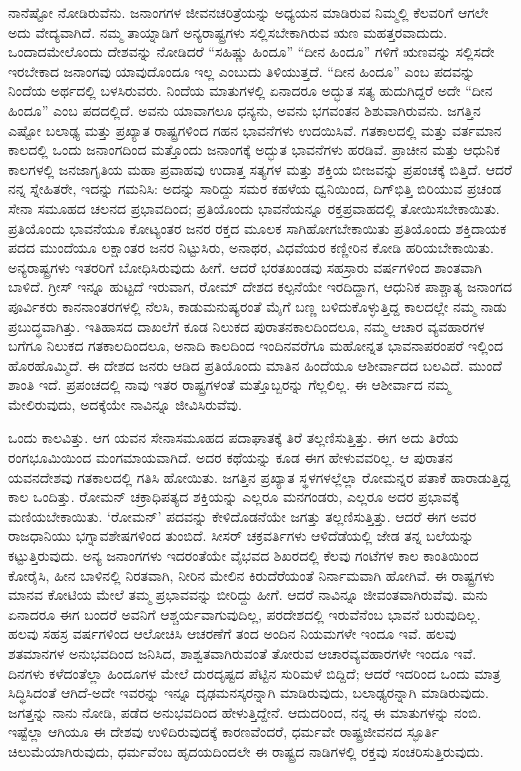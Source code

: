 ನಾನೆಷ್ಟೋ ನೋಡಿರುವೆನು. ಜನಾಂಗಗಳ ಜೀವನಚರಿತ್ರೆಯನ್ನು ಅಧ್ಯಯನ ಮಾಡಿರುವ ನಿಮ್ಮಲ್ಲಿ ಕೆಲವರಿಗೆ ಆಗಲೇ ಅದು ವೇದ್ಯವಾಗಿದೆ. ನಮ್ಮ ತಾಯ್ನಾಡಿಗೆ ಅನ್ಯರಾಷ್ಟ್ರಗಳು ಸಲ್ಲಿಸಬೇಕಾಗಿರುವ ಋಣ ಮಹತ್ತರವಾದುದು. ಒಂದಾದಮೇಲೊಂದು ದೇಶವನ್ನು ನೋಡಿದರೆ “ಸಹಿಷ್ಣು ಹಿಂದೂ” “ದೀನ ಹಿಂದೂ” ಗಳಿಗೆ ಋಣವನ್ನು ಸಲ್ಲಿಸದೇ ಇರಬೇಕಾದ ಜನಾಂಗವು ಯಾವುದೊಂದೂ ಇಲ್ಲ ಎಂಬುದು ತಿಳಿಯುತ್ತದೆ. “ದೀನ ಹಿಂದೂ” ಎಂಬ ಪದವನ್ನು ನಿಂದೆಯ ಅರ್ಥದಲ್ಲಿ ಬಳಸಿರುವರು. ನಿಂದೆಯ ಮಾತುಗಳಲ್ಲಿ ಏನಾದರೂ ಅದ್ಭುತ ಸತ್ಯ ಹುದುಗಿದ್ದರೆ ಅದೇ “ದೀನ ಹಿಂದೂ” ಎಂಬ ಪದದಲ್ಲಿದೆ. ಅವನು ಯಾವಾಗಲೂ ಧನ್ಯನು, ಅವನು ಭಗವಂತನ ಶಿಶುವಾಗಿರುವನು. ಜಗತ್ತಿನ ಎಷ್ಟೋ ಬಲಾಢ್ಯ ಮತ್ತು ಪ್ರಖ್ಯಾತ ರಾಷ್ಟ್ರಗಳಿಂದ ಗಹನ ಭಾವನೆಗಳು ಉದಯಿಸಿವೆ. ಗತಕಾಲದಲ್ಲಿ ಮತ್ತು ವರ್ತಮಾನ ಕಾಲದಲ್ಲಿ ಒಂದು ಜನಾಂಗದಿಂದ ಮತ್ತೊಂದು ಜನಾಂಗಕ್ಕೆ ಅದ್ಭುತ ಭಾವನೆಗಳು ಹರಡಿವೆ. ಪ್ರಾಚೀನ ಮತ್ತು ಆಧುನಿಕ ಕಾಲಗಳಲ್ಲಿ ಜನಜಾಗೃತಿಯ ಮಹಾ ಪ್ರವಾಹವು ಉದಾತ್ತ ಸತ್ಯಗಳ ಮತ್ತು ಶಕ್ತಿಯ ಬೀಜವನ್ನು ಪ್ರಪಂಚಕ್ಕೆ ಬಿತ್ತಿದೆ. ಆದರೆ ನನ್ನ ಸ್ನೇಹಿತರೇ, ಇದನ್ನು ಗಮನಿಸಿ: ಅದನ್ನು ಸಾರಿದ್ದು ಸಮರ ಕಹಳೆಯ ಧ್ವನಿಯಿಂದ, ದಿಗ್​ಭಿತ್ತಿ ಬಿರಿಯುವ ಪ್ರಚಂಡ ಸೇನಾ ಸಮೂಹದ ಚಲನದ ಪ್ರಭಾವದಿಂದ; ಪ್ರತಿಯೊಂದು ಭಾವನೆಯನ್ನೂ ರಕ್ತಪ್ರವಾಹದಲ್ಲಿ ತೋಯಿಸಬೇಕಾಯಿತು. ಪ್ರತಿಯೊಂದು ಭಾವನೆಯೂ ಕೋಟ್ಯಂತರ ಜನರ ರಕ್ತದ ಮೂಲಕ ಸಾಗಿಹೋಗಬೇಕಾಯಿತು ಪ್ರತಿಯೊಂದು ಶಕ್ತಿದಾಯಕ ಪದದ ಮುಂದೆಯೂ ಲಕ್ಷಾಂತರ ಜನರ ನಿಟ್ಟುಸಿರು, ಅನಾಥರ, ವಿಧವೆಯರ ಕಣ್ಣೀರಿನ ಕೋಡಿ ಹರಿಯಬೇಕಾಯಿತು. ಅನ್ಯರಾಷ್ಟ್ರಗಳು ಇತರರಿಗೆ ಬೋಧಿಸಿರುವುದು ಹೀಗೆ. ಆದರೆ ಭರತಖಂಡವು ಸಹಸ್ರಾರು ವರ್ಷಗಳಿಂದ ಶಾಂತವಾಗಿ ಬಾಳಿದೆ. ಗ್ರೀಸ್​ ಇನ್ನೂ ಹುಟ್ಟದೆ ಇರುವಾಗ, ರೋಮ್​ ದೇಶದ ಕಲ್ಪನೆಯೇ ಇರದಿದ್ದಾಗ, ಆಧುನಿಕ ಪಾಶ್ಚಾತ್ಯ ಜನಾಂಗದ ಪೂರ್ವಿಕರು ಕಾನನಾಂತರಗಳಲ್ಲಿ ನೆಲಸಿ, ಕಾಡುಮನುಷ್ಯರಂತೆ ಮೈಗೆ ಬಣ್ಣ ಬಳಿದುಕೊಳ್ಳುತ್ತಿದ್ದ ಕಾಲದಲ್ಲೇ ನಮ್ಮ ನಾಡು ಪ್ರಬುದ್ಧವಾಗಿತ್ತು. ಇತಿಹಾಸದ ದಾಖಲೆಗೆ ಕೂಡ ನಿಲುಕದ ಪುರಾತನಕಾಲದಿಂದಲೂ, ನಮ್ಮ ಆಚಾರ ವ್ಯವಹಾರಗಳ ಬಗೆಗೂ ನಿಲುಕದ ಗತಕಾಲದಿಂದಲೂ, ಅನಾದಿ ಕಾಲದಿಂದ ಇಂದಿನವರೆಗೂ ಮಹೋನ್ನತ ಭಾವನಾಪರಂಪರೆ ಇಲ್ಲಿಂದ ಹೊರಹೊಮ್ಮಿದೆ. ಈ ದೇಶದ ಜನರು ಆಡಿದ ಪ್ರತಿಯೊಂದು ಮಾತಿನ ಹಿಂದೆಯೂ ಆಶೀರ್ವಾದದ ಬಲವಿದೆ. ಮುಂದೆ ಶಾಂತಿ ಇದೆ. ಪ್ರಪಂಚದಲ್ಲಿ ನಾವು ಇತರ ರಾಷ್ಟ್ರಗಳಂತೆ ಮತ್ತೊಬ್ಬರನ್ನು ಗೆಲ್ಲಲಿಲ್ಲ. ಈ ಆಶೀರ್ವಾದ ನಮ್ಮ ಮೇಲಿರುವುದು, ಅದಕ್ಕೆಯೇ ನಾವಿನ್ನೂ ಜೀವಿಸಿರುವೆವು.

ಒಂದು ಕಾಲವಿತ್ತು. ಆಗ ಯವನ ಸೇನಾಸಮೂಹದ ಪದಾಘಾತಕ್ಕೆ ತಿರೆ ತಲ್ಲಣಿಸುತ್ತಿತ್ತು. ಈಗ ಅದು ತಿರೆಯ ರಂಗಭೂಮಿಯಿಂದ ಮಂಗಮಾಯವಾಗಿದೆ. ಅದರ ಕಥೆಯನ್ನು ಕೂಡ ಈಗ ಹೇಳುವವರಿಲ್ಲ. ಆ ಪುರಾತನ ಯವನದೇಶವು ಗತಕಾಲದಲ್ಲಿ ಗತಿಸಿ ಹೋಯಿತು. ಜಗತ್ತಿನ ಪ್ರಖ್ಯಾತ ಸ್ಥಳಗಳಲ್ಲೆಲ್ಲಾ ರೋಮನ್ನರ ಪತಾಕೆ ಹಾರಾಡುತ್ತಿದ್ದ ಕಾಲ ಒಂದಿತ್ತು. ರೋಮನ್​ ಚಕ್ರಾಧಿಪತ್ಯದ ಶಕ್ತಿಯನ್ನು ಎಲ್ಲರೂ ಮನಗಂಡರು, ಎಲ್ಲರೂ ಅದರ ಪ್ರಭಾವಕ್ಕೆ ಮಣಿಯಬೇಕಾಯಿತು. ‘ರೋಮನ್​’ ಪದವನ್ನು ಕೇಳಿದೊಡನೆಯೇ ಜಗತ್ತು ತಲ್ಲಣಿಸುತ್ತಿತ್ತು. ಆದರೆ ಈಗ ಅವರ ರಾಜಧಾನಿಯು ಭಗ್ನಾವಶೇಷಗಳಿಂದ ತುಂಬಿದೆ. ಸೀಸರ್​ ಚಕ್ರವರ್ತಿಗಳು ಆಳಿದೆಡೆಯಲ್ಲಿ ಜೇಡ ತನ್ನ ಬಲೆಯನ್ನು ಕಟ್ಟುತ್ತಿರುವುದು. ಅನ್ಯ ಜನಾಂಗಗಳು ಇದರಂತೆಯೇ ವೈಭವದ ಶಿಖರದಲ್ಲಿ ಕೆಲವು ಗಂಟೆಗಳ ಕಾಲ ಕಾಂತಿಯಿಂದ ಕೋರೈಸಿ, ಹೀನ ಬಾಳಿನಲ್ಲಿ ನಿರತವಾಗಿ, ನೀರಿನ ಮೇಲಿನ ಕಿರುದೆರೆಯಂತೆ ನಿರ್ನಾಮವಾಗಿ ಹೋಗಿವೆ. ಈ ರಾಷ್ಟ್ರಗಳು ಮಾನವ ಕೋಟಿಯ ಮೇಲೆ ತಮ್ಮ ಪ್ರಭಾವವನ್ನು ಬೀರಿದ್ದು ಹೀಗೆ. ಆದರೆ ನಾವಿನ್ನೂ ಜೀವಂತವಾಗಿರುವೆವು. ಮನು ಏನಾದರೂ ಈಗ ಬಂದರೆ ಅವನಿಗೆ ಆಶ್ಚರ್ಯವಾಗುವುದಿಲ್ಲ, ಪರದೇಶದಲ್ಲಿ ಇರುವೆನೆಂಬ ಭಾವನೆ ಬರುವುದಿಲ್ಲ. ಹಲವು ಸಹಸ್ರ ವರ್ಷಗಳಿಂದ ಆಲೋಚಿಸಿ ಆಚರಣೆಗೆ ತಂದ ಅಂದಿನ ನಿಯಮಗಳೇ ಇಂದೂ ಇವೆ. ಹಲವು ಶತಮಾನಗಳ ಅನುಭವದಿಂದ ಜನಿಸಿದ, ಶಾಶ್ವತವಾಗಿರುವಂತೆ ತೋರುವ ಆಚಾರ\break ವ್ಯವಹಾರಗಳೇ ಇಂದೂ ಇವೆ. ದಿನಗಳು ಕಳೆದಂತೆಲ್ಲಾ ಹಿಂದೂಗಳ ಮೇಲೆ ದುರದೃಷ್ಟದ ಪೆಟ್ಟಿನ ಸುರಿಮಳೆ ಬಿದ್ದಿದೆ; ಆದರೆ ಇದರಿಂದ ಒಂದು ಮಾತ್ರ ಸಿದ್ಧಿಸಿದಂತೆ ಆಗಿದೆ-ಅದೇ ಇವರನ್ನು ಇನ್ನೂ ದೃಢಮನಸ್ಕರನ್ನಾಗಿ ಮಾಡಿರುವುದು, ಬಲಾಢ್ಯರನ್ನಾಗಿ ಮಾಡಿರುವುದು. ಜಗತ್ತನ್ನು ನಾನು ನೋಡಿ, ಪಡೆದ ಅನುಭವದಿಂದ ಹೇಳುತ್ತಿದ್ದೇನೆ. ಆದುದರಿಂದ, ನನ್ನ ಈ ಮಾತುಗಳನ್ನು ನಂಬಿ. ಇಷ್ಟೆಲ್ಲಾ ಆಗಿಯೂ ಈ ದೇಶವು ಉಳಿದಿರುವುದಕ್ಕೆ ಕಾರಣವೆಂದರೆ, ಧರ್ಮವೇ ರಾಷ್ಟ್ರಜೀವನದ ಸ್ಫೂರ್ತಿ ಚಿಲುಮೆಯಾಗಿರುವುದು, ಧರ್ಮವೆಂಬ ಹೃದಯದಿಂದಲೇ ಈ ರಾಷ್ಟ್ರದ ನಾಡಿಗಳಲ್ಲಿ ರಕ್ತವು ಸಂಚರಿಸುತ್ತಿರುವುದು.

